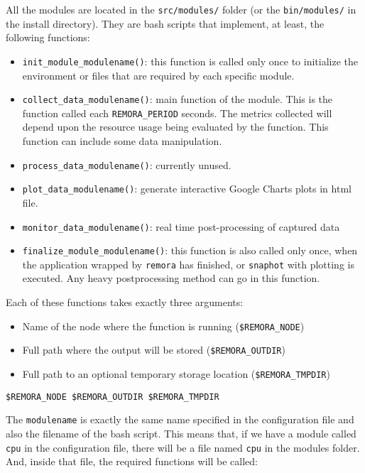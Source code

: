 \documentclass[10pt,a4paper]{report}
\begin{document}
All the modules are located in the \verb+src/modules/+ folder (or the \verb+bin/modules/+ in the install directory). 
They are bash scripts that implement, at least, the following functions:

\begin{itemize}
	\item \texttt{init\_module\_modulename()}: this function is called only once to initialize the environment or files that are required by each specific module.
	\item \texttt{collect\_data\_modulename()}: main function of the module. This is the function called each \texttt{REMORA\_PERIOD} seconds. The metrics collected will depend upon the resource usage being evaluated by the function. This function can include some data manipulation.
	\item \texttt{process\_data\_modulename()}: currently unused.
	\item \texttt{plot\_data\_modulename()}: generate interactive Google Charts plots in html file.
	\item \texttt{monitor\_data\_modulename()}: real time post-processing of captured data
	\item \texttt{finalize\_module\_modulename()}: this function is also called only once, when the application wrapped by \verb+remora+ has finished, or \verb+snaphot+ with plotting is executed. Any heavy postprocessing method can go in this function.
\end{itemize}

Each of these functions takes exactly three arguments: 

\begin{itemize}
\item Name of the node where the function is running (\texttt{\$REMORA\_NODE})
\item Full path where the output will be stored (\texttt{\$REMORA\_OUTDIR})
\item Full path to an optional temporary storage location (\texttt{\$REMORA\_TMPDIR})
\end{itemize}

\verb+$REMORA_NODE $REMORA_OUTDIR $REMORA_TMPDIR+

The \texttt{modulename} is exactly the same name specified in the configuration file and also the filename of the bash script. This means that, if we have a module called \texttt{cpu} in the configuration file, there will be a file named \texttt{cpu} in the modules folder. And, inside that file, the required functions will be called:
\end{document}
